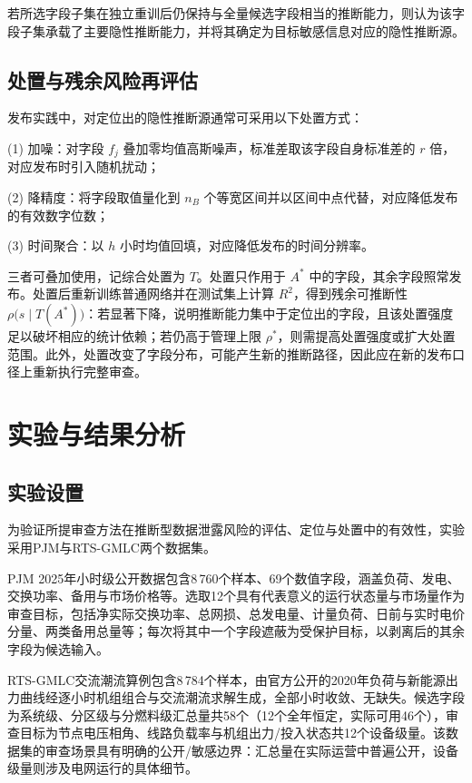 \documentclass[UTF8,zihao=5,twoside,fontset=none]{ctexart}
\begin{document}
若所选字段子集在独立重训后仍保持与全量候选字段相当的推断能力，则认为该字段子集承载了主要隐性推断能力，并将其确定为目标敏感信息对应的隐性推断源。

\subsection{处置与残余风险再评估}

发布实践中，对定位出的隐性推断源通常可采用以下处置方式：

(1) 加噪：对字段 $f_j$ 叠加零均值高斯噪声，标准差取该字段自身标准差的 $r$ 倍，对应发布时引入随机扰动；

(2) 降精度：将字段取值量化到 $n_B$ 个等宽区间并以区间中点代替，对应降低发布的有效数字位数；

(3) 时间聚合：以 $h$ 小时均值回填，对应降低发布的时间分辨率。

三者可叠加使用，记综合处置为 $T$。处置只作用于 $A^{\ast}$ 中的字段，其余字段照常发布。处置后重新训练普通网络并在测试集上计算 $R^2$，得到残余可推断性 $\rho\big(s\mid T(A^{\ast})\big)$：若显著下降，说明推断能力集中于定位出的字段，且该处置强度足以破坏相应的统计依赖；若仍高于管理上限 $\rho^{\ast}$，则需提高处置强度或扩大处置范围。此外，处置改变了字段分布，可能产生新的推断路径，因此应在新的发布口径上重新执行完整审查。

\section{实验与结果分析}

\subsection{实验设置}

为验证所提审查方法在推断型数据泄露风险的评估、定位与处置中的有效性，实验采用PJM与RTS-GMLC两个数据集。

PJM 2025年小时级公开数据\cite{ref-pjm-dataminer}包含8\,760个样本、69个数值字段，涵盖负荷、发电、交换功率、备用与市场价格等。选取12个具有代表意义的运行状态量与市场量作为审查目标，包括净实际交换功率、总网损、总发电量、计量负荷、日前与实时电价分量、两类备用总量等；每次将其中一个字段遮蔽为受保护目标，以剥离后的其余字段为候选输入。

RTS-GMLC交流潮流算例\cite{ref-rtsgmlc}包含8\,784个样本，由官方公开的2020年负荷与新能源出力曲线经逐小时机组组合与交流潮流求解生成，全部小时收敛、无缺失。候选字段为系统级、分区级与分燃料级汇总量共58个（12个全年恒定，实际可用46个），审查目标为节点电压相角、线路负载率与机组出力/投入状态共12个设备级量。该数据集的审查场景具有明确的公开/敏感边界：汇总量在实际运营中普遍公开，设备级量则涉及电网运行的具体细节。
\end{document}
